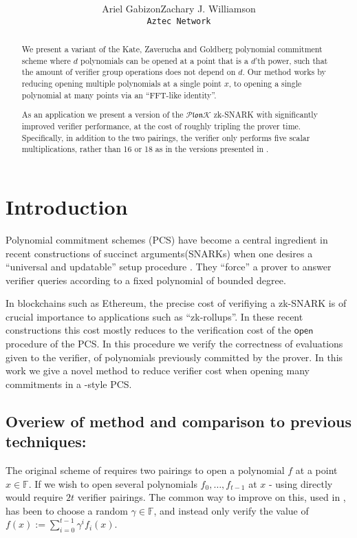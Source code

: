 \documentclass[11pt]{article} %
\title{ \bf \papertitle \\[0.72cm]}
\author{Ariel Gabizon\qquad  Zachary J. Williamson \\ \tt{Aztec Network\;\;\;}}
\newcommand{\F}{\ensuremath{\mathbb F}\xspace}
\newcommand{\open}{\ensuremath{\mathsf{open}}\xspace}
\newcommand{\defeq}{:=}
\newcommand{\plonk}{\ensuremath{\mathcal{P} \mathfrak{lon}\mathcal{K}}\xspace}
\begin{document}
    \maketitle

\begin{abstract}
We present a variant of the Kate, Zaverucha and Goldberg polynomial commitment scheme \cite{kate} where $d$ polynomials can be opened at a point that is a $d$'th power, such that the amount of verifier group operations does not depend on $d$.
Our method works by reducing opening multiple polynomials at a single point $x$, to opening a single polynomial at many points via an ``FFT-like identity''.

As an application we present a version of the \plonk zk-SNARK\cite{plonk} with significantly improved verifier performance, at the cost of roughly tripling the prover time. Specifically, in addition to the two pairings, the verifier only performs five scalar multiplications, rather than 16 or 18 as in the versions presented in \cite{plonk}.
\end{abstract}

\section{Introduction}

Polynomial commitment schemes (PCS)\cite{kate} have become a central ingredient in recent constructions of succinct arguments(SNARKs) \cite{sonic,auroralight, marlin,plonk,supersonic} when one desires a ``universal and updatable'' setup procedure \cite{firstUniversal}.
They ``force'' a prover to answer verifier queries according to a fixed polynomial of bounded degree.

In blockchains such as Ethereum, the precise cost of verifiying a zk-SNARK is of crucial importance to applications such as ``zk-rollups''\cite{rollups}. In these recent constructions this cost mostly reduces to the verification cost of the \open procedure of the PCS. 
In this procedure we verify the correctness of evaluations given to the verifier, of polynomials previously committed by the prover.
In this work we give a novel method to reduce verifier cost when opening many commitments in a \cite{kate}-style PCS. 

\subsection{Overiew  of method and comparison to previous techniques:}
The original scheme of \cite{kate} requires two pairings to open a polynomial $f$ at a point $x\in \F$.
If we wish to open several polynomials $f_0,\ldots,f_{t-1}$ at $x$ - using \cite{kate} directly would require $2t$ verifier pairings. 
The common way to improve on this, used in \cite{sonic,marlin,plonk}, has been to choose a random $\gamma \in \F$,
and instead only verify the value of $f(x)\defeq \sum^{t-1}_{i=0} \gamma^i f_i(x)$.
\end{document}
